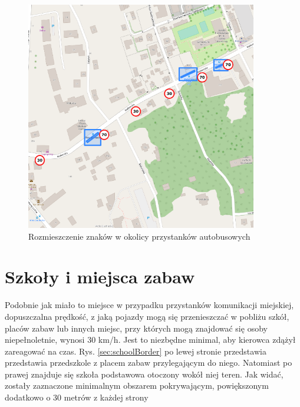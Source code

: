 \begin{figure}[h]
\caption{Rozmieszczenie znaków w okolicy przystanków autobusowych}
\label{sec:busStopSpeed}
\centering
\includegraphics[width=0.9\textwidth]{busStopSpeed}
\end{figure}

\newpage
\section{Szkoły i miejsca zabaw}

Podobnie jak miało to miejsce w przypadku przystanków komunikacji miejskiej, dopuszczalna prędkość, z jaką pojazdy mogą się przenieszczać w pobliżu szkół, placów zabaw lub innych miejsc, przy których mogą znajdować się osoby niepełnoletnie, wynosi 30 km/h. Jest to niezbędne minimal, aby kierowca zdążył zareagować na czas. Rys. \ref{sec:schoolBorder} po lewej stronie przedstawia przedstawia przedszkole z placem zabaw przylegającym do niego. Natomiast po prawej znajduje się szkoła podstawowa otoczony wokół niej teren. Jak widać, zostały zaznaczone minimalnym obszarem pokrywającym, powiększonym dodatkowo o 30 metrów z każdej strony

